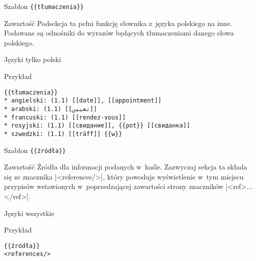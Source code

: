 \spacer
\begin{opis}
	\item[Szablon] \verb|{{tłumaczenia}}|
	\item[Zawartość] Podsekcja ta pełni funkcję słownika z~języka polskiego na inne. Podawane są odnośniki do wyrazów będących tłumaczeniami danego słowa polskiego.
	\item[Języki] tylko polski
	\item[Przykład]
\begin{lstlisting}
{{tłumaczenia}}
* angielski: (1.1) [[date]], [[appointment]]
* arabski: (1.1) [[تعيين]]
* francuski: (1.1) [[rendez-vous]]
* rosyjski: (1.1) [[свидание]], {{pot}} [[свиданка]]
* szwedzki: (1.1) [[träff]] {{w}}
\end{lstlisting}
\end{opis}
\spacer
\begin{opis}
	\item[Szablon] \verb|{{źródła}}|
	\item[Zawartość] Źródła dla informacji podanych w~haśle. Zazwyczaj sekcja ta składa się ze znacznika \kod|<references/>|, który powoduje wyświetlenie w~tym miejscu przypisów wstawionych w~poprzedzającej zawartości strony znaczników \kod|<ref>...</ref>|.
	\item[Języki] wszystkie
	\item[Przykład]
\begin{lstlisting}
{{źródła}}
<references/>
\end{lstlisting}
\end{opis}
